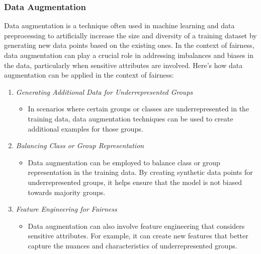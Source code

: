 \documentclass[12pt,a4paper,openright,twoside]{book}
\begin{document}
\subsubsection{Data Augmentation}

Data augmentation is a technique often used in machine learning and data preprocessing to artificially increase the size and diversity of a training dataset by generating new data points based on the existing ones. In the context of fairness, data augmentation can play a crucial role in addressing imbalances and biases in the data, particularly when sensitive attributes are involved. Here's how data augmentation can be applied in the context of fairness:

\begin{enumerate}

    \item \emph{Generating Additional Data for Underrepresented Groups}
    
    \begin{itemize}

        \item In scenarios where certain groups or classes are underrepresented in the training data, data augmentation techniques can be used to create additional examples for those groups. \cite{sharma2020data}
    
    \end{itemize}
    
    \item \emph{Balancing Class or Group Representation}
    
    \begin{itemize}
        
        \item Data augmentation can be employed to balance class or group representation in the training data. By creating synthetic data points for underrepresented groups, it helps ensure that the model is not biased towards majority groups.
    
    \end{itemize}
    
    \item \emph{Feature Engineering for Fairness}
    
    \begin{itemize}
        
        \item Data augmentation can also involve feature engineering that considers sensitive attributes. For example, it can create new features that better capture the nuances and characteristics of underrepresented groups. \cite{10.14778/3461535.3463474}
    

\end{itemize}
\end{enumerate}
\end{document}
